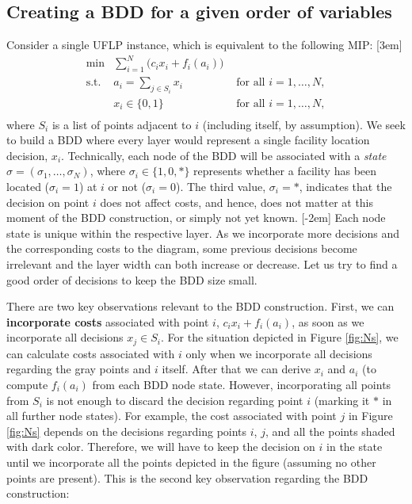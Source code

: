 \documentclass[11pt]{article}
\begin{document}
\subsection{Creating a BDD for a given order of variables}
\label{sec:orge69b2ab}
Consider a single UFLP instance, which is
equivalent to the following MIP: [3em]
\begin{subequations}\label{eq:UFLP}
\begin{align}
  \min & \sum_{i=1}^N \Big(c_i x_i + f_i(a_i)\Big)&\\
    \textrm{s.t. } & a_i = \sum_{j\in S_i} x_i& \textrm{ for all } i=1,\ldots, N,\\
    & x_i\in\{0,1\} & \textrm{ for all } i=1,\ldots,N,\\
\end{align}
\end{subequations}
where \(S_i\) is a list of points adjacent to \textcircled{$i$} (including itself,
by assumption). We seek to build a BDD where every layer would represent a
single facility location decision, \(x_i\). Technically, each node of the BDD will
be associated with a \emph{state} \(\sigma = (\sigma_1, \ldots, \sigma_N)\), where
\(\sigma_i\in\{1,0,*\}\) represents whether a facility has been located
(\(\sigma_i=1\)) at \textcircled{$i$} or not (\(\sigma_i=0\)). The third value,
\(\sigma_i=*\), indicates that the decision on point \textcircled{$i$} does not
affect costs, and hence, does not matter at this moment of the BDD construction,
or simply not yet known. [-2em] Each node state is unique within the respective layer. As we
incorporate more decisions and the corresponding costs to the diagram, some
previous decisions become irrelevant and the layer width can both increase or
decrease. Let us try to find a good order of decisions to keep the BDD size
small.

There are two key observations relevant to the BDD construction. First, we can
\textbf{incorporate costs} associated with point \(i\), \(c_i x_i + f_i(a_i)\), as soon as
we incorporate all decisions \(x_j\in S_i\). For the situation depicted in Figure
\ref{fig:Ns}, we can calculate costs associated with \textcircled{$i$} only when
we incorporate all decisions regarding the gray points and \textcircled{$i$}
itself. After that we can derive \(x_i\) and \(a_i\) (to compute \(f_i(a_i)\) from
each BDD node state. However, incorporating all points from
\(S_i\) is not enough to discard the decision regarding point \textcircled{$i$}
(marking it \(*\) in all further node states). For example, the cost associated
with point \textcircled{$j$} in Figure \ref{fig:Ns} depends on the decisions
regarding points \textcircled{$i$}, \textcircled{$j$}, and all the points shaded
with dark color. Therefore, we will have to keep the decision on
\textcircled{$i$} in the state until we incorporate all the points depicted in
the figure (assuming no other points are present). This is the second key
observation regarding the BDD construction:
\end{document}
